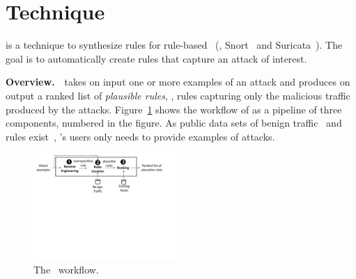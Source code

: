 \documentclass[conference]{IEEEtran}
\begin{document}
\section{Technique}
\label{sec:technique}

\tname{} is a technique to synthesize rules for rule-based
\nids~(\eg{}, Snort~\cite{snort} and Suricata~\cite{suricata}). The
goal is to automatically create rules that capture an attack of
interest.

\vspace{1ex}
\noindent\textbf{Overview.}~\tname\ takes on input one or more
examples of an attack and produces on output a ranked list of
\emph{plausible rules}, \ie{}, rules capturing only the malicious
traffic produced by the attacks. Figure~\ref{fig:overview} shows the
workflow of \tname{} as a pipeline of three components, numbered in
the figure. As public data sets of benign
traffic~\cite{tcpreplay,stratosphere-normal} and rules
exist~\cite{emerging-threats-open}, \tname{}'s users only needs to
provide examples of attacks.


\begin{figure}[t!]
  \centering
  \includegraphics[trim=0 340 50 0,clip,width=0.48\textwidth]{figs/nids-workflow}
  \caption{The \tname\ workflow.}
  \label{fig:overview}
  \vspace{-4ex}
\end{figure}


\end{document}
